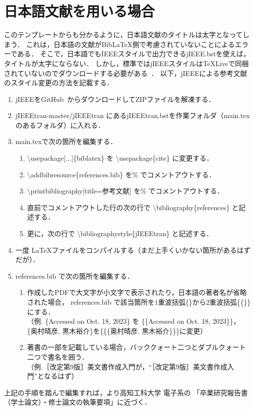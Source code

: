 \chapter{日本語文献を用いる場合}
このテンプレートからも分かるように，日本語文献のタイトルは太字となってしまう．
これは，日本語の文献がBib{\LaTeX}側で考慮されていないことによるエラーである．
そこで，日本語でもIEEEスタイルで出力できるjIEEE.bstを使えば，タイトルが太字にならない．
しかし，標準ではjIEEEスタイルは\TeX Liveで同梱されていないのでダウンロードする必要がある~\cite{jieeetran}．
以下，jIEEEによる参考文献のスタイル変更の方法を記載する．

\begin{enumerate}
    \item jIEEEをGitHub~\cite{jieeetran}からダウンロードしてZIPファイルを解凍する．
    \item jIEEEtran-master/jIEEEtran にあるjIEEEtran.bstを作業フォルダ（main.texのあるフォルダ）に入れる．
    \item main.texで次の箇所を編集する．
        \begin{enumerate}
            \item \textbackslash usepackage[...]\{biblatex\} を \textbackslash usepackage\{cite\} に変更する．
            \item \textbackslash addbibresource\{references.bib\} を\% でコメントアウトする．
            \item \textbackslash printbibliography[title={参考文献}] を\% でコメントアウトする．
            \item 直前でコメントアウトした行の次の行で \textbackslash bibliography\{references\} と記述する．
            \item 更に，次の行で \textbackslash bibliographystyle\{jIEEEtran\} と記述する．
        \end{enumerate}
    \item 一度 \LaTeX ファイルをコンパイルする（まだ上手くいかない箇所があるはずだが）．
    \item references.bib で次の箇所を編集する．
        \begin{enumerate}
            \item 作成したPDFで大文字が小文字で表示されたり，日本語の著者名が省略された場合，
                references.bib で該当箇所を$1$重波括弧\{\}から$2$重波括弧\{\{\}\}にする．\\
                （例. \{Accessed on Oct. 18, 2023\} を \{\{Accessed on Oct. 18, 2023\}\}，\\
                    \{奥村晴彦, 黒木裕介\}を\{\{\{奥村晴彦, 黒木裕介\}\}\}に変更）
            \item 著書の一部を記載している場合，バッククォート二つとダブルクォート二つで書名を囲う．\\
                （例.［改定第$9$版］\LaTeXe 美文書作成入門が，``［改定第$9$版］\LaTeXe 美文書作成入門''となるはず）
        \end{enumerate}
\end{enumerate}

上記の手順を踏んで編集すれば，より高知工科大学 電子系の
「卒業研究報告書（学士論文）・修士論文の執筆要項」に近づく．